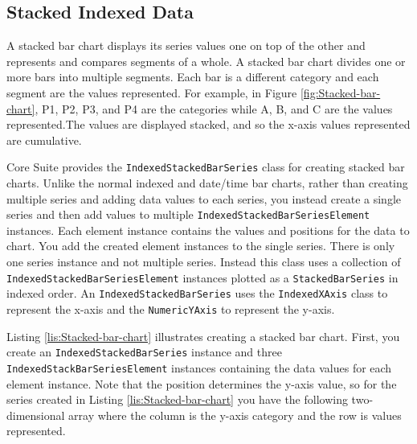 \documentclass[american,letterpaper]{tufte-book}
\numberwithin{equation}{section}
\numberwithin{figure}{section}
\begin{document}
{\subsection{Stacked Indexed Data}\label{subsec:Stacked-Indexed-Data}

A stacked bar chart displays its series values one on top of the other
and represents and compares segments of a whole. A stacked bar chart
divides one or more bars into multiple segments. Each bar is a different
category and each segment are the values represented. For example,
in Figure \ref{fig:Stacked-bar-chart}, P1, P2, P3, and P4 are the
categories while A, B, and C are the values represented.The values
are displayed stacked, and so the x-axis values represented are cumulative. 

Core Suite provides the \texttt{IndexedStackedBarSeries} class for
creating stacked bar charts. Unlike the normal indexed and date/time
bar charts, rather than creating multiple series and adding data values
to each series, you instead create a single series and then add values
to multiple \texttt{IndexedStackedBarSeriesElement} instances. Each
element instance contains the values and positions for the data to
chart. You add the created element instances to the single series.
There is only one series instance and not multiple series. Instead this class uses a collection of \texttt{IndexedStackedBarSeriesElement}
instances plotted as a \texttt{StackedBarSeries} in indexed order.
An \texttt{IndexedStackedBarSeries} uses the \texttt{IndexedXAxis}
class to represent the x-axis and the \texttt{NumericYAxis} to represent
the y-axis.

Listing \ref{lis:Stacked-bar-chart} illustrates creating a stacked
bar chart. First, you create an \texttt{IndexedStackedBarSeries} instance
and three \texttt{IndexedStackBarSeriesElement} instances containing
the data values for each element instance. Note that the position
determines the y-axis value, so for the series created in Listing
\ref{lis:Stacked-bar-chart} you have the following two-dimensional
array where the column is the y-axis category and the row is values
represented.

}
\end{document}
